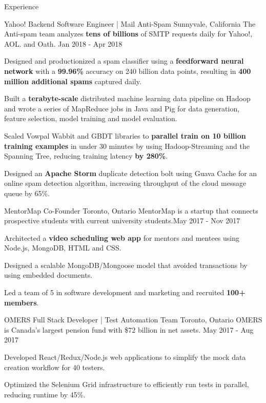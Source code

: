 \documentclass{resume} %
\begin{document}
\begin{rSection}{Experience}

\begin{expSec}
{Yahoo!}
{Backend Software Engineer | Mail Anti-Spam}
{Sunnyvale, California}
{The Anti-spam team analyzes \textbf{tens of billions} of SMTP requests daily for Yahoo!, AOL. and Oath.}
{Jan 2018 - Apr 2018}
\item Designed and productionized a spam classifier using a \textbf{feedforward neural network} with a \textbf{99.96\%} accuracy on 240 billion data points, resulting in \textbf{400 million additional spams} captured daily.
\item Built a \textbf{terabyte-scale} distributed machine learning data pipeline on Hadoop and wrote a series of MapReduce jobs in Java and Pig for data generation, feature selection, model training and model evaluation.
\item Scaled Vowpal Wabbit and GBDT libraries to \textbf{parallel train on 10 billion training examples} in under 30 minutes by using Hadoop-Streaming and the Spanning Tree, reducing training latency \textbf{by 280\%}.
\item Designed an \textbf{Apache Storm} duplicate detection bolt using Guava Cache for an online spam detection algorithm, increasing throughput of the cloud message queue by 65\%.

\end{expSec}

\begin{expSec}
{MentorMap}
{Co-Founder \href{https://www.mentormap.ca/}{\space\small\faExternalLink}}
{Toronto, Ontario}
{MentorMap is a startup that connects prospective students with current university students.}{May 2017 - Nov 2017}
\item Architected a \textbf{video scheduling web app} for mentors and mentees using Node.js, MongoDB, HTML and CSS.
\item Designed a scalable MongoDB/Mongoose model that avoided transactions by using embedded documents.
\item Led a team of 5 in software development and marketing and recruited \textbf{100+ members}.
\end{expSec}

\begin{expSec}
{OMERS}
{Full Stack Developer | Test Automation Team}
{Toronto, Ontario}
{OMERS is Canada's largest pension fund with \$72 billion in net assets.}
{May 2017 - Aug 2017}
\item Developed React/Redux/Node.js web applications to simplify the mock data creation workflow for 40 testers.
\item Optimized the Selenium Grid infrastructure to efficiently run tests in parallel, reducing runtime by 45\%. \end{expSec}

\end{rSection}
\end{document}
